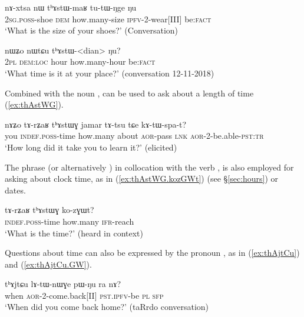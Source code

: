  \begin{exe}
\ex \label{ex:thAstWmaR}
 \gll   nɤ-xtsa nɯ tʰɤstɯ-maʁ tu-tɯ-ŋge ŋu   \\
\textsc{2sg}.\textsc{poss}-shoe \textsc{dem} how.many-size \textsc{ipfv}-2-wear[III] be:\textsc{fact} \\ 
\glt `What is the size of your shoes?'  (Conversation)
\end{exe} 
 
 \begin{exe}
\ex \label{ex:thAstWdian}
 \gll  nɯʑo nɯtɕu tʰɤstɯ-<dian>  ŋu? \\
 \textsc{2pl} \textsc{dem}:\textsc{loc} hour how.many-hour be:\textsc{fact} \\
 \glt `What time is it at your place?' (conversation 12-11-2018)
\end{exe} 

Combined with the noun , 	 can be used to ask about a length of time (\ref{ex:thAstWG}).

\begin{exe}
\ex \label{ex:thAstWG}
 \gll   nɤʑo tɤ-rʑaʁ tʰɤstɯɣ jamar tɤ-tsu tɕe kɤ-tɯ-spa-t?  \\
 you \textsc{indef}.\textsc{poss}-time how.many about \textsc{aor}-pass \textsc{lnk} \textsc{aor}-2-be.able-\textsc{pst}:\textsc{tr} \\
\glt   `How long did it take you to learn it?' (elicited)
\end{exe} 

The phrase  (or alternatively ) in collocation with the verb , is also employed for asking about clock time, as in (\ref{ex:thAstWG.kozGWt}) (see §\ref{sec:hours}) or dates. %

 \begin{exe}
\ex \label{ex:thAstWG.kozGWt}
 \gll   tɤ-rʑaʁ tʰɤstɯɣ ko-zɣɯt? \\
  \textsc{indef}.\textsc{poss}-time how.many  \textsc{ifr}-reach \\
  \glt `What is the time?' (heard in context)
  \end{exe} 
    
Questions about time can also be expressed by the pronoun , as in  (\ref{ex:thAjtCu}) and (\ref{ex:thAjtCu.GW}).

\begin{exe}
\ex \label{ex:thAjtCu}
\gll  tʰɤjtɕu lɤ-tɯ-nɯɣe pɯ-ŋu ra nɤ?    \\
 when \textsc{aor}-2-come.back[II] \textsc{pst}.\textsc{ipfv}-be \textsc{pl} \textsc{sfp} \\
\glt  `When did you come back home?' (taRrdo conversation)
\end{exe} 

